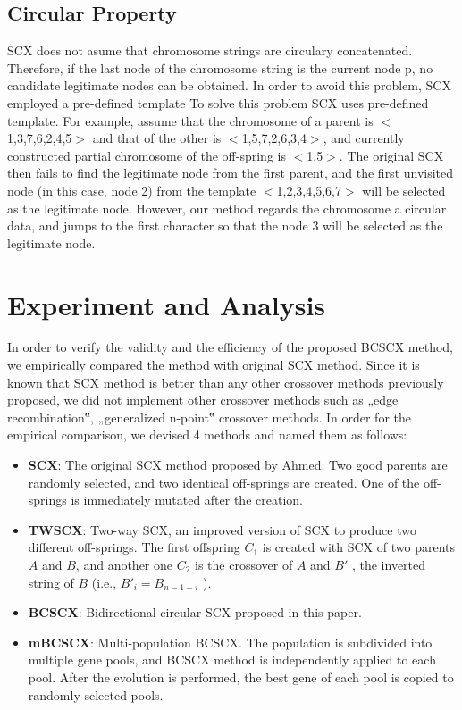 \subsection{Circular Property}

SCX does not asume that chromosome strings are circulary concatenated. Therefore, if the last node of the chromosome string is the current node p, no candidate legitimate nodes can be obtained. In order to avoid this problem, SCX employed a pre-defined template
To solve this problem SCX uses pre-defined template. For example, assume that the chromosome of a parent is $<$1,3,7,6,2,4,5$>$ and that of the other is $<$1,5,7,2,6,3,4$>$, and currently constructed partial chromosome of the off-spring is $<$1,5$>$. The original SCX then fails to find the legitimate node from the first parent, and the first unvisited node (in this case, node 2) from the template $<$1,2,3,4,5,6,7$>$ will be selected as the legitimate node. However, our method regards the chromosome a circular data, and jumps to the first character so that the node 3 will be selected as the legitimate node.

\section{Experiment and Analysis}

In order to verify the validity and the efficiency of the proposed BCSCX method, we empirically compared the method with original SCX method. Since it is known that SCX method is better than any other crossover methods previously proposed, we did not implement other crossover methods such as „edge recombination‟, „generalized n-point‟ crossover methods. In order for the empirical comparison, we devised 4 methods and named them as follows:

\begin{itemize}
\item{{\bf SCX}: The original SCX method proposed by Ahmed\cite{a}. Two good parents are randomly selected, and two identical off-springs are created. One of the off-springs is immediately mutated after the creation.}
\item{{\bf TWSCX}: Two-way SCX, an improved version of SCX to produce two different off-springs. The first offspring $C_1$ is created with SCX of two parents $A$ and $B$, and another one $C_2$ is the crossover of $A$ and $B'$ , the inverted string of $B$ (i.e., $B′_i = B_{n-1-i}$ ).}
\item{{\bf BCSCX}: Bidirectional circular SCX proposed in this paper.}
\item{{\bf mBCSCX}: Multi-population BCSCX. The population is subdivided into multiple gene pools, and BCSCX method is independently applied to each pool. After the evolution is performed, the best gene of each pool is copied to randomly selected pools. }
\end{itemize}


